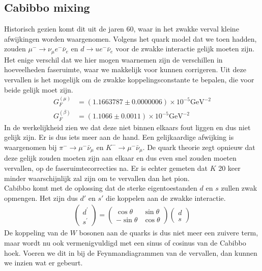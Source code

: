 \documentclass[../main.tex]{subfiles}
\begin{document}
\subsection{Cabibbo mixing}%
\label{sub:cabibbo_mixing}

Historisch gezien komt dit uit de jaren 60, waar in het zwakke verval kleine afwijkingen worden waargenomen. Volgens het quark model dat we toen hadden, zouden $\mu^{-} \rightarrow \nu_{\mu} e^{-} \bar{\nu}_{e}$ en $d \rightarrow u e^{-} \bar{\nu}_{e}$ voor de zwakke interactie gelijk moeten zijn. Het enige verschil dat we hier mogen waarnemen zijn de verschillen in hoeveelheden faseruimte, waar we makkelijk voor kunnen corrigeren. Uit deze vervallen is het mogelijk om de zwakke koppelingsconstante te bepalen, die voor beide gelijk moet zijn.
\begin{equation}
    \begin{aligned}
        \label{eq:afwijking_zwak_verval}
        G_{F}^{(\mu)}&=(1.1663787 \pm 0.0000006) \times 10^{-5} \text{GeV}^{-2} \\
        G_{F}^{(\beta)}&=(1.1066 \pm 0.0011) \times 10^{-5} \text{GeV}^{-2}
    \end{aligned}
\end{equation}
In de werkelijkheid zien we dat deze niet binnen elkaars fout liggen en dus niet gelijk zijn. Er is dus iets meer aan de hand. Een gelijkaardige afwijking is waargenomen bij $\pi^{-} \rightarrow \mu^{-} \bar{\nu}_{\mu}$ en $K^{-} \rightarrow \mu^{-} \bar{\nu}_{\mu}$. De quark theorie zegt opnieuw dat deze gelijk zouden moeten zijn aan elkaar en dus even snel zouden moeten vervallen, op de faseruimtecorrecties na. Er is echter gemeten dat $K$ 20 keer minder waarschijnlijk zal zijn om te vervallen dan het pion.\\
Cabibbo komt met de oplossing dat de sterke eigentoestanden $d$ en $s$ zullen zwak opmengen. Het zijn dus $d'$ en $s'$ die koppelen aan de zwakke interactie.
\begin{equation}
    \begin{aligned}
        \label{eq:cabb_opmenging}
        \left(\begin{array}{c}
                d^{\prime} \\
                s^{\prime}
                \end{array}\right)=\left(\begin{array}{cc}
                \cos \theta & \sin \theta \\
                -\sin \theta & \cos \theta
                \end{array}\right)\left(\begin{array}{l}
                d \\
                s
        \end{array}\right)
    \end{aligned}
\end{equation}
De koppeling van de $W$ bosonen aan de quarks is dus niet meer een zuivere term, maar wordt nu ook vermenigvuldigd met een sinus of cosinus van de Cabibbo hoek. Voeren we dit in bij de Feynmandiagrammen van de vervallen, dan kunnen we inzien wat er gebeurt.
\end{document}
